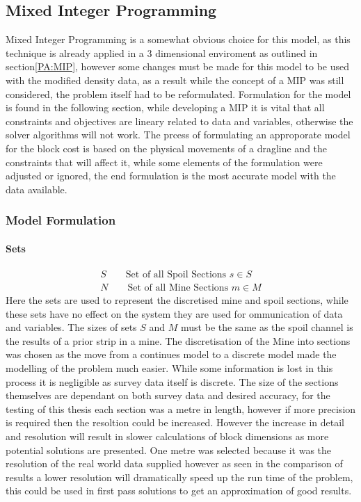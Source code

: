 \subsection{Mixed Integer Programming}
Mixed Integer Programming is a somewhat obvious choice for this model, as this technique is already applied in a 3 dimensional enviroment as outlined in section\ref{PA:MIP}, however some changes must be made for this model to be used with the modified density data, as a result while the concept of a MIP was still considered, the problem itself had to be reformulated. Formulation for the model is found in the following section, while developing a MIP it is vital that all constraints and objectives are lineary related to data and variables, otherwise the solver algorithms will not work. The prcess of formulating an approporate model for the block cost is based on the physical movements of a dragline and the constraints that will affect it, while some elements of the formulation were adjusted or ignored, the end formulation is the most accurate model with the data available. 
\subsubsection{Model Formulation} 
\paragraph*{Sets}
\begin{align}
\label{MIP:Set:S}
S\qquad \text{Set of all Spoil Sections   } s\in S\\
\label{MIP:Set:N}
N\qquad \text{Set  of all Mine Sections } m \in M
\end{align}
Here the sets are used to represent the discretised mine and spoil sections, while these sets have no effect on the system they are used for ommunication of data and variables. The sizes of sets $S$ and $M$ must be the same as the spoil channel is the results of a prior strip in a mine. The discretisation of the Mine into sections was chosen as the move from a continues model to a discrete model made the modelling of the problem much easier. While some information is lost in this process it is negligible as survey data itself is discrete. The size of the sections themselves are dependant on both survey data and desired accuracy, for the testing of this thesis each section was a metre in length, however if more precision is required then the resoltion could be increased. However the increase in detail and resolution will result in slower calculations of block dimensions as more potential solutions are presented. One metre was selected because it was the resolution of the real world data supplied however as seen in the comparison of results a lower resolution will dramatically speed up the run time of the problem, this could be used in first pass solutions to get an approximation of good results. 
